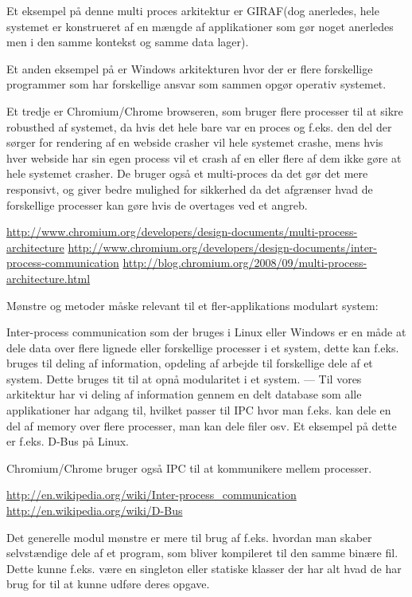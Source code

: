 Et eksempel på denne multi proces arkitektur er GIRAF(dog anerledes, hele systemet er konstrueret af en mængde af applikationer som gør noget anerledes men i den samme kontekst og samme data lager). 

Et anden eksempel på er Windows arkitekturen hvor der er flere forskellige programmer som har forskellige ansvar som sammen opgør operativ systemet. 

Et tredje er Chromium/Chrome browseren, som bruger flere processer til at sikre robusthed af systemet, da hvis det hele bare var en proces og f.eks. den del der sørger for rendering af en webside crasher vil hele systemet crashe, mens hvis hver webside har sin egen process vil et crash af en eller flere af dem ikke gøre at hele systemet crasher. De bruger også et multi-proces da det gør det mere responsivt, og giver bedre mulighed for sikkerhed da det afgrænser hvad de forskellige processer kan gøre hvis de overtages ved et angreb.

\url{http://www.chromium.org/developers/design-documents/multi-process-architecture}
\url{http://www.chromium.org/developers/design-documents/inter-process-communication}
\url{http://blog.chromium.org/2008/09/multi-process-architecture.html}

Mønstre og metoder måske relevant til et fler-applikations modulart system:

Inter-process communication som der bruges i Linux eller Windows er en måde at dele data over flere lignede eller forskellige processer i et system, dette kan f.eks. bruges til deling af information, opdeling af arbejde til forskellige dele af et system. Dette bruges tit til at opnå modularitet i et system. --- Til vores arkitektur har vi deling af information gennem en delt database som alle applikationer har adgang til, hvilket passer til IPC hvor man f.eks. kan dele en del af memory over flere processer, man kan dele filer osv. Et eksempel på dette er f.eks. D-Bus på Linux.

Chromium/Chrome bruger også IPC til at kommunikere mellem processer.

\url{http://en.wikipedia.org/wiki/Inter-process_communication}
\url{http://en.wikipedia.org/wiki/D-Bus}

Det generelle modul mønstre er mere til brug af f.eks. hvordan man skaber selvstændige dele af et program, som bliver kompileret til den samme binære fil. Dette kunne f.eks. være en singleton eller statiske klasser der har alt hvad de har brug for til at kunne udføre deres opgave. 

